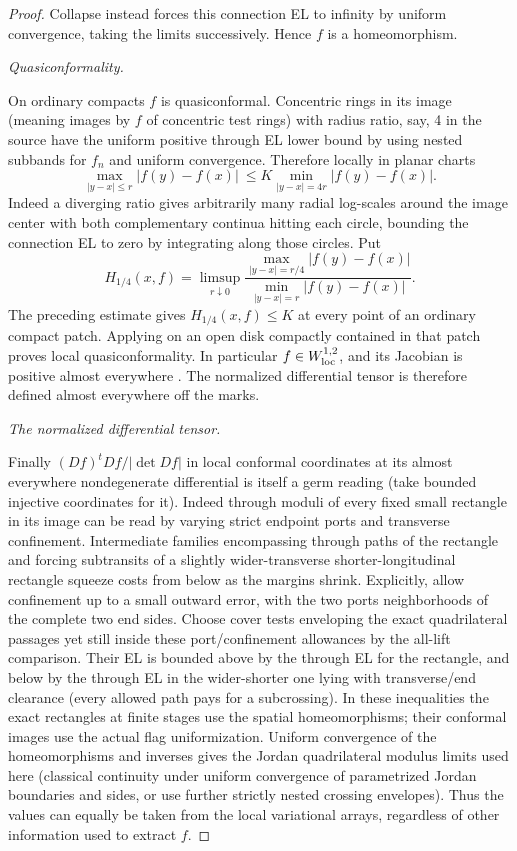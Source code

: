 \begin{proof}
Collapse instead forces this connection EL to infinity by uniform convergence, taking the limits
successively. Hence \(f\) is a homeomorphism.

\smallskip\noindent\emph{Quasiconformality.}\par

On ordinary compacts \(f\) is quasiconformal. Concentric rings in its image (meaning images by \(f\)
of concentric test rings) with radius ratio, say, 4 in the source have the uniform positive through
EL lower bound by using nested subbands for \(f_n\) and uniform convergence. Therefore locally in
planar charts
\[
 \max_{|y-x|\le r}|f(y)-f(x)|\ \le K\min_{|y-x|=4r}|f(y)-f(x)|.
\]
Indeed a diverging ratio gives arbitrarily many radial log-scales around the image center with both
complementary continua hitting each circle, bounding the connection EL to zero by integrating along
those circles. Put
\[
 H_{1/4}(x,f)=\limsup_{r\downarrow0}
 \frac{\max_{|y-x|=r/4}|f(y)-f(x)|}
      {\min_{|y-x|=r}|f(y)-f(x)|}.
\]
The preceding estimate gives \(H_{1/4}(x,f)\le K\) at every
point of an ordinary compact patch. Applying
\cite[Theorem~1, with $\alpha=1/4$ and any $H>K$]{CristeaQC}
on an open disk compactly contained in that patch proves local
quasiconformality. In particular \(f\in W^{1,2}_{\rm loc}\), and its
Jacobian is positive almost everywhere
\cite[Theorem~3.1.2]{AIMQuasiconformal}. The normalized differential
tensor is therefore defined almost everywhere off the marks.

\smallskip\noindent\emph{The normalized differential tensor.}\par

Finally \( (Df)^t Df/|\det Df|\) in local conformal coordinates at its almost everywhere
nondegenerate differential is itself a germ reading (take bounded injective coordinates for it).
Indeed through moduli of every fixed small rectangle in its image can be read by varying strict
endpoint ports and transverse confinement. Intermediate families encompassing through paths of the
rectangle and forcing subtransits of a slightly wider-transverse shorter-longitudinal rectangle
squeeze costs from below as the margins shrink. Explicitly, allow confinement up to a small outward
error, with the two ports neighborhoods of the complete two end sides. Choose cover tests enveloping
the exact quadrilateral passages yet still inside these port/confinement allowances by the all-lift
comparison. Their EL is bounded above by the through EL for the rectangle, and below by the through
EL in the wider-shorter one lying with transverse/end clearance (every allowed path pays for a
subcrossing). In these inequalities the exact rectangles at finite stages use the spatial
homeomorphisms; their conformal images use the actual flag uniformization. Uniform convergence of
the homeomorphisms and inverses gives the Jordan quadrilateral modulus limits used here (classical
continuity under uniform convergence of parametrized Jordan boundaries and sides, or use further
strictly nested crossing envelopes). Thus the values can equally be taken from the local variational
arrays, regardless of other information used to extract \(f\).


\end{proof}
